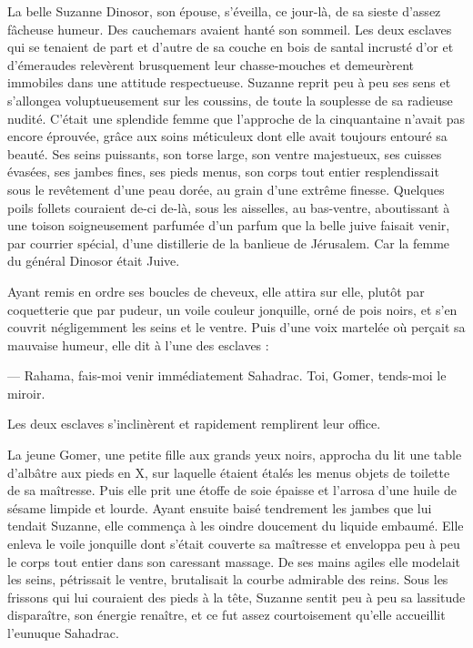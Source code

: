 \documentclass[a4paper, 11pt, oneside, polutonikogreek, french]{article}
\begin{document}
\bigskip
\centerline{\EightStarTaper}
\centerline{\EightStarTaper\EightStarTaper}
\bigskip

La belle Suzanne Dinosor, son épouse, s'éveilla, ce jour-là, de sa sieste d'assez fâcheuse humeur. Des cauchemars avaient hanté son sommeil. Les deux esclaves qui se tenaient de part et d'autre de sa couche en bois de santal incrusté d'or et d'émeraudes relevèrent brusquement leur chasse-mouches et demeurèrent immobiles dans une attitude respectueuse. Suzanne reprit peu à peu ses sens et s'allongea voluptueusement sur les coussins, de toute la souplesse de sa radieuse nudité. C'était une splendide femme que l'approche de la cinquantaine n'avait pas encore éprouvée, grâce aux soins méticuleux dont elle avait toujours entouré sa beauté. Ses seins puissants, son torse large, son ventre majestueux, ses cuisses évasées, ses jambes fines, ses pieds menus, son corps tout entier resplendissait sous le revêtement d'une peau dorée, au grain d'une extrême finesse. Quelques poils follets couraient de-ci de-là, sous les aisselles, au bas-ventre, aboutissant à une toison soigneusement parfumée d'un parfum que la belle juive faisait venir, par courrier spécial, d'une distillerie de la banlieue de Jérusalem. Car la femme du général Dinosor était Juive.

\bigskip
\centerline{\EightStarTaper}
\centerline{\EightStarTaper\EightStarTaper}
\bigskip

Ayant remis en ordre ses boucles de cheveux, elle attira sur elle, plutôt par coquetterie que par pudeur, un voile couleur jonquille, orné de pois noirs, et s'en couvrit négligemment les seins et le ventre. Puis d'une voix martelée où perçait sa mauvaise humeur, elle dit à l'une des esclaves :

--- Rahama, fais-moi venir immédiatement Sahadrac. Toi, Gomer, tends-moi le miroir.

Les deux esclaves s'inclinèrent et rapidement remplirent leur office.

La jeune Gomer, une petite fille aux grands yeux noirs, approcha du lit une table d'albâtre aux pieds en X, sur laquelle étaient étalés les menus objets de toilette de sa maîtresse. Puis elle prit une étoffe de soie épaisse et l'arrosa d'une huile de sésame limpide et lourde. Ayant ensuite baisé tendrement les jambes que lui tendait Suzanne, elle commença à les oindre doucement du liquide embaumé. Elle enleva le voile jonquille dont s'était couverte sa maîtresse et enveloppa peu à peu le corps tout entier dans son caressant massage. De ses mains agiles elle modelait les seins, pétrissait le ventre, brutalisait la courbe admirable des reins. Sous les frissons qui lui couraient des pieds à la tête, Suzanne sentit peu à peu sa lassitude disparaître, son énergie renaître, et ce fut assez courtoisement qu'elle accueillit l'eunuque Sahadrac.
\end{document}
